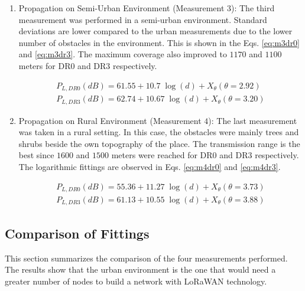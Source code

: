 \begin{enumerate}
\item Propagation on Semi-Urban Environment (Measurement $3$): The third measurement was performed in a semi-urban environment. Standard deviations are lower compared to the urban measurements due to the lower number of obstacles in the environment. This is shown in the Eqs. \eqref{eq:m3dr0} and \eqref{eq:m3dr3}. The maximum coverage also improved to $1170$ and $1100$ meters for DR$0$ and DR$3$ respectively.

\begin{eqnarray}
P_{L,DR0}(dB) = 61.55+10.7\;\log(d)+X_\theta(\theta=2.92) \label{eq:m3dr0} \\
P_{L,DR3}(dB) = 62.74+10.67\;\log(d)+X_\theta(\theta=3.20) \label{eq:m3dr3}
\end{eqnarray}

\item Propagation on Rural Environment (Measurement $4$): The last measurement was taken in a rural setting. In this case, the obstacles were mainly trees and shrubs beside the own topography of the place. The transmission range is the best since $1600$ and $1500$ meters were reached for DR$0$ and DR$3$ respectively. The logarithmic fittings are observed in Eqs. \eqref{eq:m4dr0} and \eqref{eq:m4dr3}.

\begin{eqnarray} 
P_{L,DR0}(dB) = 55.36+11.27\;\log(d)+X_\theta(\theta=3.73) \label{eq:m4dr0} \\
P_{L,DR3}(dB) = 61.13+10.55\;\log(d)+X_\theta(\theta=3.88) \label{eq:m4dr3}
\end{eqnarray}

\end{enumerate}

\subsection{Comparison of Fittings}
\label{sub:compfittings}
This section summarizes the comparison of the four measurements performed. The results show that the urban environment is the one that would need a greater number of nodes to build a network with LoRaWAN technology.

